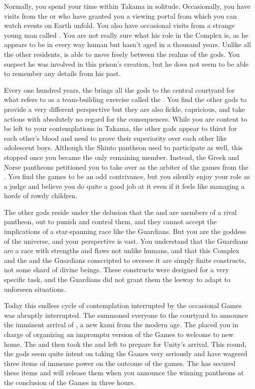 \documentclass[char]{guardians}
\begin{document}
Normally, you spend your time within Takama in solitude. Occasionally, you have visits from the \cCaretaker{} or \cWarden{} who have granted you a viewing portal from which you can watch events on Earth unfold. You also have occasional visits from a strange young man called \cJascha{\intro}. You are not really sure what his role in the Complex is, as he appears to be in every way human but hasn't aged in a thousand years. Unlike all the other residents, \cJascha{} is able to move freely between the realms of the gods. You suspect he was involved in this prison's creation, but he does not seem to be able to remember any details from his past.

Every one hundred years, the \cCaretaker{} brings all the gods to the central courtyard for what \cCaretaker{\they} refers to as a team-building exercise called the \pGames{}. You find the other gods to provide a very different perspective but they are also fickle, capricious, and take actions with absolutely no regard for the consequences. While you are content to be left to your contemplations in Takama, the other gods appear to thirst for each other's blood and need to prove their superiority over each other like adolescent boys. Although the Shinto pantheon used to participate as well, this stopped once you became the only remaining member. Instead, the Greek and Norse pantheons petitioned you to take over as the arbiter of the games from the \cCaretaker{}. You find the games to be an odd contrivance, but you silently enjoy your role as a judge and believe you do quite a good job at it even if it feels like managing a horde of rowdy children.

The other gods reside under the delusion that the \cCaretaker{} and \cWarden{} are members of a rival pantheon, out to punish and control them, and they cannot accept the implications of a star-spanning race like the Guardians. But you are the goddess of the universe, and your perspective is vast. You understand that the Guardians are a race with strengths and flaws not unlike humans, and that this Complex and the \cCaretaker{} and \cWarden{} the Guardians conscripted to oversee it are simply finite constructs, not some shard of divine beings. These constructs were designed for a very specific task, and the Guardians did not grant them the leeway to adapt to unforseen situations.

Today this endless cycle of contemplation interrupted by the occasional Games was abruptly interrupted. The \cCaretaker{} summoned everyone to the courtyard to announce the imminent arrival of \cUnity{}, a new kami from the modern age. The \cCaretaker{} placed you in charge of organizing an impromptu version of the Games to welcome \cUnity{} to \cUnity{\their} new home. The \cCaretaker{} and \cWarden{} then took the \stone{} and left to prepare for Unity's arrival. This round, the gods seem quite intent on taking the Games very seriously and have wagered three items of immense power on the outcome of the games. The \cCaretaker{} has secured these items and will release them when you announce the winning pantheons at the conclusion of the Games in three hours.
\end{document}
